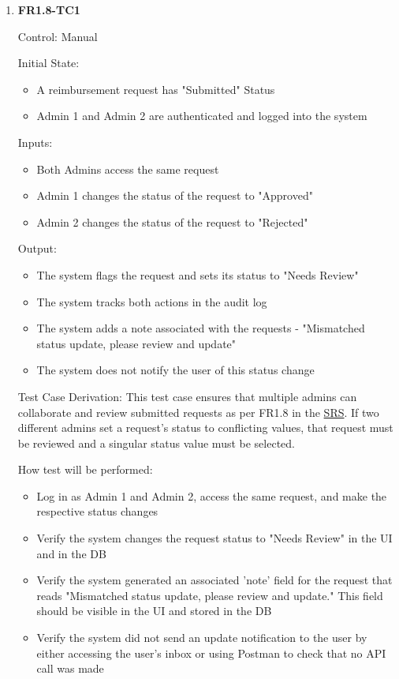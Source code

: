 \documentclass[12pt, titlepage]{article}
\begin{document}
\begin{enumerate}
    \item{\textbf{FR1.8-TC1}}
    \hypertarget{FR1.8-TC1}{}
    
    Control: Manual
    
    Initial State:
    \begin{itemize}
        \item A reimbursement request has "Submitted" Status
        \item Admin 1 and Admin 2 are authenticated and logged into the system
    \end{itemize}
    
    Inputs: 
    \begin{itemize}
        \item Both Admins access the same request
        \item Admin 1 changes the status of the request to "Approved"
        \item Admin 2 changes the status of the request to "Rejected"
    \end{itemize}
    
    Output: 
    \begin{itemize}
        \item The system flags the request and sets its status to "Needs Review"
        \item The system tracks both actions in the audit log
        \item The system adds a note associated with the requests - "Mismatched status update, please review and update" 
        \item The system does not notify the user of this status change
    \end{itemize}
    
    Test Case Derivation: This test case ensures that multiple admins can collaborate and review submitted requests as per FR1.8 in the \href{https://shorturl.at/FdAgR}{SRS}. If two different admins set a request's status to conflicting values, that request must be reviewed and a singular status value must be selected.
    
    How test will be performed:
    \begin{itemize}
        \item Log in as Admin 1 and Admin 2, access the same request, and make the respective status changes
        \item Verify the system changes the request status to "Needs Review" in the UI and in the DB
        \item Verify the system generated an associated 'note' field for the request that reads "Mismatched status update, please review and update." This field should be visible in the UI and stored in the DB
        \item Verify the system did not send an update notification to the user by either accessing the user's inbox or using Postman to check that no API call was made
    \end{itemize}
\end{enumerate}
\end{document}
